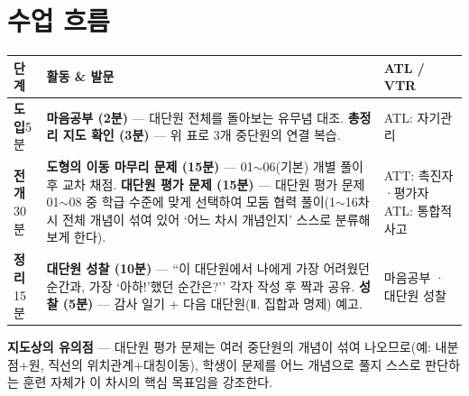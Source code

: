 \documentclass[11pt,a4paper]{article}
\begin{document}
\section{수업 흐름}
\begin{tabularx}{\linewidth}{@{}>{\centering\arraybackslash}p{1.6cm}X>{\raggedright\arraybackslash\small}p{3.1cm}@{}}
\toprule
\textbf{단계} & \textbf{활동 \& 발문} & \textbf{ATL / VTR} \\
\midrule
\textcolor{goldstrong}{\textbf{도입}}\newline\footnotesize 5분 &
\textbf{마음공부 (2분)} --- 대단원 전체를 돌아보는 유무념 대조.\newline
\textbf{총정리 지도 확인 (3분)} --- 위 표로 3개 중단원의 연결 복습. &
ATL: 자기관리 \\
\addlinespace
\textcolor{goldstrong}{\textbf{전개}}\newline\footnotesize 30분 &
\textbf{도형의 이동 마무리 문제 (15분)} --- 01$\sim$06(기본) 개별 풀이 후 교차 채점.\newline
\textbf{대단원 평가 문제 (15분)} --- 대단원 평가 문제 01$\sim$08 중 학급 수준에 맞게 선택하여 모둠 협력 풀이(1$\sim$16차시 전체 개념이 섞여 있어 `어느 차시 개념인지' 스스로 분류해 보게 한다). &
ATT: 촉진자·평가자\newline ATL: 통합적 사고 \\
\addlinespace
\textcolor{goldstrong}{\textbf{정리}}\newline\footnotesize 15분 &
\textbf{대단원 성찰 (10분)} --- ``이 대단원에서 나에게 가장 어려웠던 순간과, 가장 `아하!'했던 순간은?'' 각자 작성 후 짝과 공유.\newline
\textbf{성찰 (5분)} --- 감사 일기 + 다음 대단원(Ⅱ. 집합과 명제) 예고. &
마음공부 · 대단원 성찰 \\
\bottomrule
\end{tabularx}

\begin{calloutbox}
\textbf{지도상의 유의점} --- 대단원 평가 문제는 여러 중단원의 개념이 섞여 나오므로(예: 내분점+원, 직선의 위치관계+대칭이동), 학생이 문제를 어느 개념으로 풀지 스스로 판단하는 훈련 자체가 이 차시의 핵심 목표임을 강조한다.
\end{calloutbox}
\end{document}
